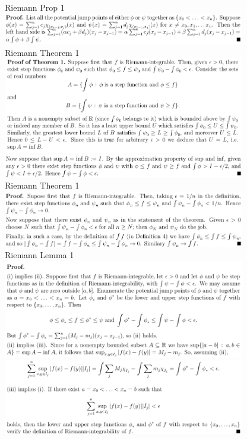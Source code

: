 \documentclass[8pt,landscape]{article}
\begin{document}
\begin{multicols}{2}
    Riemann Prop 1
    \includegraphics[width=400]{R_p1.png} \\
    Riemann Theorem 1
    \includegraphics[width=400]{R_t1a.png} \\
    \includegraphics[width=400]{R_t1b.png} \\
    Riemann Theorem 1
    \includegraphics[width=400]{R_t2.png} \\
    Riemann Lemma 1
    \includegraphics[width=400]{R_l1a.png} \\
    \includegraphics[width=400]{R_l1b.png} \\

\end{multicols}
\end{document}
